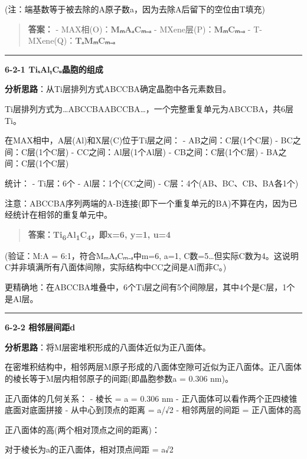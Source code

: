 \documentclass[a4paper,11pt]{ctexart}
\newcommand{\箭}{\ensuremath{\rightarrow}}
\newcommand{\左箭}{\ensuremath{\leftarrow}}
\newcommand{\上箭}{\ensuremath{\uparrow}}
\newcommand{\下箭}{\ensuremath{\downarrow}}
\newcommand{\衡}{\ensuremath{\rightleftharpoons}}
\newcommand{\双箭}{\ensuremath{\leftrightarrow}}
\newcommand{\约等于}{\ensuremath{\approx}}
\newcommand{\小于等于}{\ensuremath{\leq}}
\newcommand{\大于等于}{\ensuremath{\geq}}
\newcommand{\不等于}{\ensuremath{\neq}}
\newcommand{\西格马}{\ensuremath{\sigma}}
\newcommand{\派}{\ensuremath{\pi}}
\begin{document}
(注：端基数等于被去除的A原子数a，因为去除A后留下的空位由T填充)

\begin{quote}
\textbf{答案：}
- MAX相(O)：\textbf{MₘAₐCₘ₋ₐ}
- MXene层(P)：\textbf{MₘCₘ₋ₐ}
- T-MXene(Q)：\textbf{TₐMₘCₘ₋ₐ}
\end{quote}

\begin{center}\rule{0.5\linewidth}{0.5pt}\end{center}

\textbf{6-2-1 TiₓAlᵧCᵤ晶胞的组成}

\textbf{分析思路}：从Ti层排列方式ABCCBA确定晶胞中各元素数目。

Ti层排列方式为\ldots ABCCBAABCCBA\ldots，一个完整重复单元为ABCCBA，共6层Ti。

在MAX相中，A层(Al)和X层(C)位于Ti层之间：
- AB之间：C层(1个C层)
- BC之间：C层(1个C层)
- CC之间：Al层(1个Al层)
- CB之间：C层(1个C层)
- BA之间：C层(1个C层)

统计：
- Ti层：6个
- Al层：1个(CC之间)
- C层：4个(AB、BC、CB、BA各1个)

注意：ABCCBA序列两端的A-B连接(即下一个重复单元的BA)不算在内，因为已经统计在相邻的重复单元中。

\begin{quote}
\textbf{答案：Ti\textsubscript{6}Al\textsubscript{1}C\textsubscript{4}，即x=6, y=1, u=4}
\end{quote}

(验证：M:A = 6:1，符合MₘAₐCₘ₋ₐ中m=6, a=1, C数=5\ldots 但实际C数为4。这说明C并非填满所有八面体间隙，实际结构中CC之间是Al而非C。)

更精确地：在ABCCBA堆叠中，6个Ti层之间有5个间隙层，其中4个是C层，1个是Al层。

\begin{center}\rule{0.5\linewidth}{0.5pt}\end{center}

\textbf{6-2-2 相邻层间距d}

\textbf{分析思路}：将M层密堆积形成的八面体近似为正八面体。

在密堆积结构中，相邻两层M原子形成的八面体空隙可近似为正八面体。正八面体的棱长等于M层内相邻原子的间距(即晶胞参数a = 0.306 nm)。

正八面体的几何关系：
- 棱长 = a = 0.306 nm
- 正八面体可以看作两个正四棱锥底面对底面拼接
- 从中心到顶点的距离 = a/√2
- 相邻两层的间距 = 正八面体的高

正八面体的高(两个相对顶点之间的距离)：

对于棱长为a的正八面体，相对顶点间距 = a√2
\end{document}

